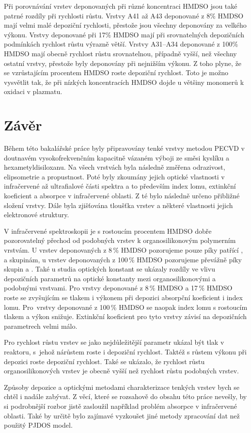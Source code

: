 \documentclass[12pt,oneside,final]{fithesis2}
\begin{document}
Při porovnávání vrstev deponovaných při různé koncentraci HMDSO jsou také patrné rozdíly při rychlosti růstu. Vrstvy A41 až A43 deponované z 8\% HMDSO mají velmi malé depoziční rychlosti, přestože jsou všechny deponovány za velkého výkonu. Vrstvy deponované při 17\% HMDSO mají při srovnatelných depozičních podmínkách rychlost růstu výrazně větší. Vrstvy A31--A34 deponované z 100\% HMDSO mají obecně rychlost růstu srovnatelnou, případně vyšší, než všechny ostatní vrstvy, přestože byly deponovány při nejnižším výkonu. Z toho plyne, že se vzrůstajícím procentem HMDSO roste depoziční rychlost. Toto je možno vysvětlit tak, že při nízkých koncentracích HMDSO dojde u většiny monomerů k oxidaci v plazmatu.




\chapter{Závěr}
Během této bakalářské práce byly připravovány tenké vrstvy metodou PECVD v doutnavém vysokofrekvenčním kapacitně vázaném výboji ze směsi kyslíku a hexametyldisiloxanu. Na všech vrstvách byla následně změřena odrazivost, elipsometrie a propustnost. Poté byly zkoumány jejich optické vlastnosti v infračervené až ultrafialové části spektra a to především index lomu, extinkční koeficient a absorpce v infračervené oblasti. Z té bylo následně určeno přibližné složení vrstvy. Dále byla zjišťována tloušťka vrstev a některé vlastnosti jejich elektronové struktury. 

V infračervené spektroskopii je s rostoucím procentem HMDSO dobře pozorovatelný přechod od  podobných vrstev k organosilikonovým polymerním vrstvám. U vrstev deponovaných z 8\,\% HMDSO pozorujeme pouze píky patřící ,  a  skupinám, u vrstev deponovaných z 100\,\% HMDSO pozorujeme převážně píky skupin  a . 
Také u studia optických konstant se ukázaly rozdíly ve vlivu depozičních parametrů na optické konstanty mezi organosilikonovými a  podobnými vrstvami. Pro vrstvy deponované z 8\,\% HMDSO a 17\,\% HMDSO roste se zvyšujícím se tlakem i výkonem při depozici absorpční koeficient i index lomu. Pro~vrstvy deponované z 100\,\% HMDSO se naopak index lomu s rostoucím tlakem a výkon snižuje. Extinkční koeficient pro tyto vrstvy závisí na depozičních parametrech velmi málo.

Pro rychlost růstu vrstev se jako nejdůležitější parametr ukázal být tlak v reaktoru, s~jehož nárůstem roste i depoziční rychlost. Taktéž s růstem výkonu při depozici roste depoziční rychlost. Také se ukázalo, že rychlost růstu organosilikonových vrstev je obecně vyšší než rychlost růstu  podobných vrstev.

Způsoby depozice a optickými metodami charakterizace tenkých vrstev bych se chtěl i nadále zabývat. Z věcí, které se rozsahově do obsahu této práce nevešly, by si podrobnější rozbor jistě zasloužil například problém absorpce v infračervené oblasti. Také by určitě bylo zajímavé vyzkoušet jiné metody zpracování dat než použitý PJDOS model. 






\end{document}
